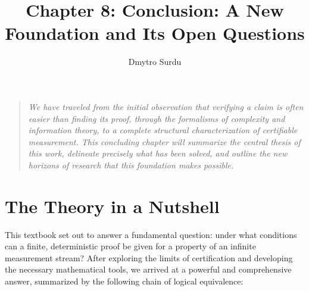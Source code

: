 \documentclass[12pt]{article}
\title{\textbf{Chapter 8: Conclusion: A New Foundation and Its Open Questions}}
\author{Dmytro Surdu}
\date{}
\begin{document}
\maketitle

\begin{quote}
\textit{We have traveled from the initial observation that verifying a claim is often easier than finding its proof, through the formalisms of complexity and information theory, to a complete structural characterization of certifiable measurement. This concluding chapter will summarize the central thesis of this work, delineate precisely what has been solved, and outline the new horizons of research that this foundation makes possible.}
\end{quote}

\section{The Theory in a Nutshell}

This textbook set out to answer a fundamental question: under what conditions can a finite, deterministic proof be given for a property of an infinite measurement stream? After exploring the limits of certification and developing the necessary mathematical tools, we arrived at a powerful and comprehensive answer, summarized by the following chain of logical equivalence:

\begin{center}
\end{center}
\end{document}
